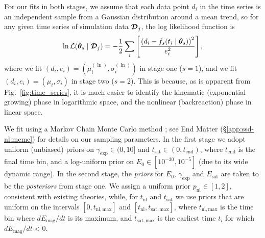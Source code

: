     For our fits in both stages, we assume that each data point $d_i$ in the time series is an independent sample from a Gaussian distribution around a mean trend, so for any given time series of simulation data $\bm{\mathcal{D}}_j$, the log likelihood function is
    \begin{align}
        \ln \mathcal{L}(\bm{\theta}_s \mid \bm{\mathcal{D}}_j)
            = -\frac{1}{2} \sum_{i} \left[ 
                \frac{ \left( d_i - f_s(t_i \mid \bm{\theta}_s)\right)^2 }{ e_i^2 }
             \right] ,
    \end{align}
    where we fit $(d_i, e_i) = (\mu_i^{(\ln)}, \sigma_i^{(\ln)})$ in stage one ($s = 1$), and we fit $(d_i, e_i) = (\mu_i, \sigma_i)$ in stage two ($s = 2$). This is because, as is apparent from Fig.~\ref{fig:time_series}, it is much easier to identify the kinematic (exponential growing) phase in logarithmic space, and the nonlinear (backreaction) phase in linear space.

    We fit using a Markov Chain Monte Carlo method \cite{Foreman-Mackey13a}; see End Matter (\S\ref{app:ssd-nl:mcmc}) for details on our sampling parameters. In the first stage we adopt uniform (unbiased) priors on $\gamma_\mathrm{exp} \in (0, 10]$ and $t_\mathrm{sat} \in (0, t_\mathrm{end})$, where $t_\mathrm{end}$ is the final time bin, and a log-uniform prior on $E_0 \in [10^{-30}, 10^{-5}]$ (due to its wide dynamic range). In the second stage, the \textit{priors} for $E_0$, $\gamma_\mathrm{exp}$ and $E_\mathrm{sat}$ are taken to be the \textit{posteriors} from stage one. We assign a uniform prior $p_\mathrm{nl} \in [1,2]$, consistent with existing theories, while, for $t_\mathrm{nl}$ and $t_\mathrm{sat}$ we use priors that are uniform on the intervals $[0,t_{\mathrm{nl}, \mathrm{max}}]$ and $[t_\mathrm{nl},t_{\mathrm{sat},\mathrm{max}}]$, where $t_{\mathrm{nl}, \mathrm{max}}$ is the time bin where $dE_\mathrm{mag}/dt$ is its maximum, and $t_{\mathrm{sat},\mathrm{max}}$ is the earliest time $t_i$ for which $dE_\mathrm{mag}/dt < 0$.

